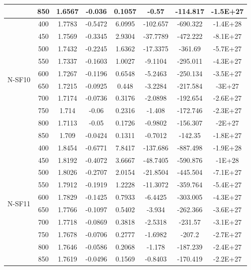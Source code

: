 {\begin{longtable}{cccccccc}
                          & 850 & 1.6567 & -0.036  & 0.1057 & -0.57    & -114.817 & -1.5E+27 \\ \hline
\multirow{10}{*}{N-SF10}  & 400 & 1.7783 & -0.5472 & 6.0995 & -102.657 & -690.322 & -1.4E+28 \\
                          & 450 & 1.7569 & -0.3345 & 2.9304 & -37.7789 & -472.222 & -8.1E+27 \\
                          & 500 & 1.7432 & -0.2245 & 1.6362 & -17.3375 & -361.69  & -5.7E+27 \\
                          & 550 & 1.7337 & -0.1603 & 1.0027 & -9.1104  & -295.011 & -4.3E+27 \\
                          & 600 & 1.7267 & -0.1196 & 0.6548 & -5.2463  & -250.134 & -3.5E+27 \\
                          & 650 & 1.7215 & -0.0925 & 0.448  & -3.2284  & -217.584 & -3E+27   \\
                          & 700 & 1.7174 & -0.0736 & 0.3176 & -2.0898  & -192.654 & -2.6E+27 \\
                          & 750 & 1.714  & -0.06   & 0.2316 & -1.408   & -172.746 & -2.3E+27 \\
                          & 800 & 1.7113 & -0.05   & 0.1726 & -0.9802  & -156.307 & -2E+27   \\
                          & 850 & 1.709  & -0.0424 & 0.1311 & -0.7012  & -142.35  & -1.8E+27 \\ \hline
\multirow{10}{*}{N-SF11}  & 400 & 1.8454 & -0.6771 & 7.8417 & -137.686 & -887.498 & -1.9E+28 \\
                          & 450 & 1.8192 & -0.4072 & 3.6667 & -48.7405 & -590.876 & -1E+28   \\
                          & 500 & 1.8026 & -0.2707 & 2.0154 & -21.8504 & -445.504 & -7.1E+27 \\
                          & 550 & 1.7912 & -0.1919 & 1.2228 & -11.3072 & -359.764 & -5.4E+27 \\
                          & 600 & 1.7829 & -0.1425 & 0.7933 & -6.4425  & -303.005 & -4.3E+27 \\
                          & 650 & 1.7766 & -0.1097 & 0.5402 & -3.934   & -262.366 & -3.6E+27 \\
                          & 700 & 1.7718 & -0.0869 & 0.3818 & -2.5318  & -231.57  & -3.1E+27 \\
                          & 750 & 1.7678 & -0.0706 & 0.2777 & -1.6982  & -207.2   & -2.7E+27 \\
                          & 800 & 1.7646 & -0.0586 & 0.2068 & -1.178   & -187.239 & -2.4E+27 \\
                          & 850 & 1.7619 & -0.0496 & 0.1569 & -0.8403  & -170.419 & -2.2E+27
\end{longtable}

}